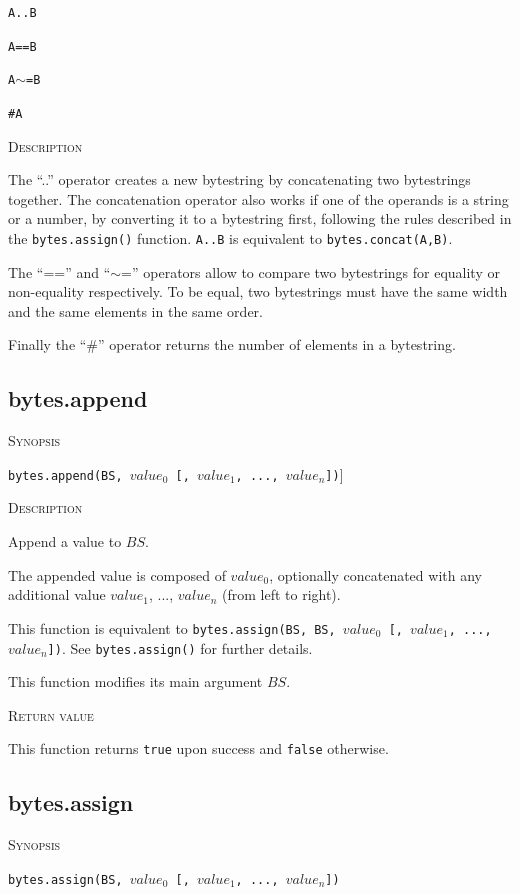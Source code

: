 \documentclass[11pt]{report}
\newcommand{\mansection}[1]{\vspace{0.5em}\par\noindent\textsc{#1}\vspace{0.5em}\par}
\begin{document}
\texttt{A..B} 

\texttt{A==B}

\texttt{A$\sim$=B}

\texttt{\#A}

\mansection{Description}
  
The ``..'' operator creates a new bytestring by concatenating two bytestrings together.
The concatenation operator also works if one of the operands is a string or a number, 
by converting it to a bytestring first, following the rules described in the 
\texttt{bytes.assign()} function. 
\texttt{A..B} is equivalent to \texttt{bytes.concat(A,B)}.
  
The ``=='' and ``$\sim$='' operators allow to compare two bytestrings for equality or
non-equality respectively. To be equal, two bytestrings must have the same width
and the same elements in the same order.
 
Finally the ``\#'' operator returns the number of elements in a bytestring.

\subsection{bytes.append}

\mansection{Synopsis}

\texttt{bytes.append(BS, $value_0$ [, $value_1$, ..., $value_n$])}]

\mansection{Description}

Append a value to $BS$.

The appended value is composed of $value_0$, optionally concatenated with
any additional value $value_1$, ..., $value_n$ (from left to right).

This function is equivalent to 
\texttt{bytes.assign(BS, BS, $value_0$ [, $value_1$, ..., $value_n$])}.
See \texttt{bytes.assign()} for further details.

This function modifies its main argument $BS$.

\mansection{Return value}

This function returns \texttt{true} upon success and \texttt{false} otherwise.

\subsection{bytes.assign}

\mansection{Synopsis}
\texttt{bytes.assign(BS, $value_0$ [, $value_1$, ..., $value_n$])}
\end{document}
